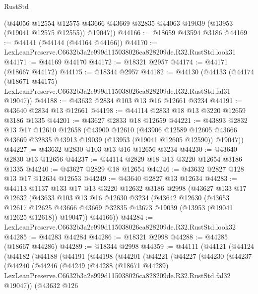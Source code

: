 \begin{lexlean}{RustStd}
\begin{coremodule}
      (@44056
        @12554
        @12575
        @43666
        @43669
        @32835
        @44063
        @19039
        (@13953 (@19041 @12575 @12555))
        @19047))
@44166 := @18659 @43594 @3186
@44169 := @44141 (@44144 (@44164 @44166))
@44170 := LexLeanPreserve.C6632b3a2e999d115038026ca828209de.R32.RustStd.look31
@44171 := @44169 @44170
@44172 := @18321 @2957
@44174 := @44171 (@18667 @44172)
@44175 := @18344 @2957
@44182 := @44130
    (@44133
      (@44174
        (@18671 @44175)
        LexLeanPreserve.C6632b3a2e999d115038026ca828209de.R32.RustStd.fal31
        @19047))
@44188 := @43632 @2834 @103 @13 @16 @12661 @3234
@44191 := @43640 @2834 @13 @12661
@44198 := @44114 @2833 @18 @13 @3220 @12659 @3186 @1335
@44201 := @43627 @2833 @18 @12659
@44221 := @43893
    @2832
    @13
    @17
    @12610
    @12658
    (@43900
      @12610
      (@43906
        @12589
        @12605
        @43666
        @43669
        @32835
        @43913
        @19039
        (@13953 (@19041 @12605 @12590))
        @19047))
@44227 := @43632 @2830 @103 @13 @16 @12656 @3234
@44230 := @43640 @2830 @13 @12656
@44237 := @44114 @2829 @18 @13 @3220 @12654 @3186 @1335
@44240 := @43627 @2829 @18 @12654
@44246 := @43632 @2827 @128 @13 @17 @12634 @12653
@44249 := @43640 @2827 @13 @12634
@44283 := @44113
    @1137
    @133
    @17
    @13
    @3220
    @12632
    @3186
    @2998
    (@43627
      @133
      @17
      @12632
      (@43633
        @103
        @13
        @16
        @12630
        @3234
        (@43642
          @12630
          (@43653
            @12617
            @12625
            @43666
            @43669
            @32835
            @43673
            @19039
            (@13953 (@19041 @12625 @12618))
            @19047))
        @44166))
@44284 := LexLeanPreserve.C6632b3a2e999d115038026ca828209de.R32.RustStd.look32
@44285 := @44283 @44284
@44286 := @18321 @2998
@44288 := @44285 (@18667 @44286)
@44289 := @18344 @2998
@44359 := @44111
    (@44121
      (@44124
        (@44182
          (@44188
            (@44191
              (@44198
                (@44201
                  (@44221
                    (@44227
                      (@44230
                        (@44237
                          (@44240
                            (@44246
                              (@44249
                                (@44288
                                  (@18671 @44289)
                                  LexLeanPreserve.C6632b3a2e999d115038026ca828209de.R32.RustStd.fal32
                                  @19047))
                              (@43632
                                @126

\end{coremodule}
\end{lexlean}
